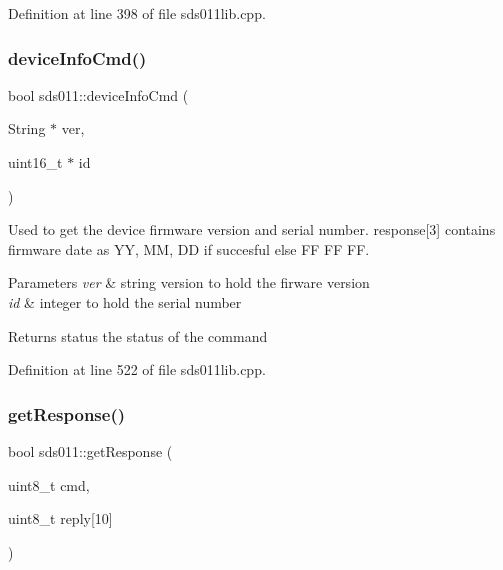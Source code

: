 Definition at line 398 of file sds011lib.\+cpp.

\mbox{\label{classsds011_ac0dfdae3b5b512aca1fbe287da29616a}} 
\subsubsection{\texorpdfstring{deviceInfoCmd()}{deviceInfoCmd()}}
{\footnotesize\ttfamily bool sds011\+::device\+Info\+Cmd (\begin{DoxyParamCaption}\item[{String $\ast$}]{ver,  }\item[{uint16\+\_\+t $\ast$}]{id }\end{DoxyParamCaption})}



Used to get the device firmware version and serial number. response\mbox{[}3\mbox{]} contains firmware date as YY, MM, DD if succesful else FF FF FF. 


\begin{DoxyParams}{Parameters}
{\em ver} & string version to hold the firware version \\
\hline
{\em id} & integer to hold the serial number \\
\hline
\end{DoxyParams}
\begin{DoxyReturn}{Returns}
status the status of the command 
\end{DoxyReturn}


Definition at line 522 of file sds011lib.\+cpp.

\mbox{\label{classsds011_a8ff0bda35ce371348033b9c2983b8999}} 
\subsubsection{\texorpdfstring{getResponse()}{getResponse()}}
{\footnotesize\ttfamily bool sds011\+::get\+Response (\begin{DoxyParamCaption}\item[{uint8\+\_\+t}]{cmd,  }\item[{uint8\+\_\+t}]{reply\mbox{[}10\mbox{]} }\end{DoxyParamCaption})\hspace{0.3cm}{\ttfamily [private]}}



